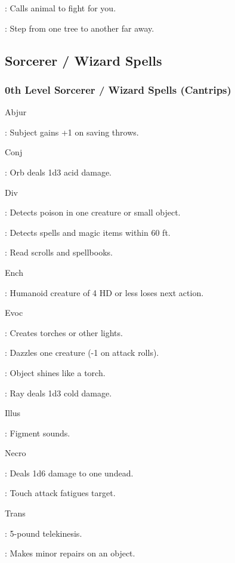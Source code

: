 : Calls animal to fight for you.

: Step from one tree to another far away.

\subsection{Sorcerer / Wizard Spells}

\subsubsection{0th Level Sorcerer / Wizard Spells (Cantrips)}

Abjur

: Subject gains +1 on saving throws.

Conj

: Orb deals 1d3 acid damage.

Div

: Detects poison in one creature or small object.

: Detects spells and magic items within 60 ft.

: Read scrolls and spellbooks.

Ench

: Humanoid creature of 4 HD or less loses next action.

Evoc

: Creates torches or other lights.

: Dazzles one creature (-1 on attack rolls).

: Object shines like a torch.

: Ray deals 1d3 cold damage.

Illus

: Figment sounds.

Necro

: Deals 1d6 damage to one undead.

: Touch attack fatigues target.

Trans

: 5-pound telekinesis.

: Makes minor repairs on an object.

